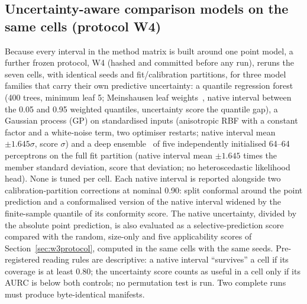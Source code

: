 \documentclass[11pt,a4paper]{article}
\begin{document}
\subsection{Uncertainty-aware comparison models on the same cells (protocol W4)}
\label{sec:w4protocol}
Because every interval in the method matrix is built around one point model,
a further frozen protocol, W4 (hashed and committed before any run), reruns the
seven cells, with identical seeds and fit/calibration partitions, for three
model families that carry their own predictive uncertainty: a quantile
regression forest (400 trees, minimum leaf 5; Meinshausen leaf
weights~\cite{meinshausen2006},
native interval between the 0.05 and 0.95 weighted quantiles, uncertainty
score the quantile gap), a Gaussian process (GP) on standardised inputs
(anisotropic RBF with a constant factor and a white-noise term, two optimiser
restarts; native interval mean $\pm 1.645\sigma$, score $\sigma$) and a deep
ensemble~\cite{lakshminarayanan2017} of five independently initialised 64--64
perceptrons on the full fit
partition (native interval mean $\pm 1.645$ times the member standard
deviation, score that deviation; no heteroscedastic likelihood head). None is
tuned per cell. Each native interval is reported alongside two
calibration-partition corrections at nominal 0.90: split conformal around the
point prediction and a conformalised version of the native interval widened by
the finite-sample quantile of its conformity score. The native uncertainty,
divided by the absolute point prediction, is also evaluated as a
selective-prediction score compared with the random, size-only and five
applicability scores of Section~\ref{sec:w3protocol}, computed in the same
cells with the same seeds. Pre-registered reading rules are descriptive: a
native interval ``survives'' a cell if its coverage is at least 0.80; the
uncertainty score counts as useful in a cell only if its AURC is below both
controls; no permutation test is run. Two complete runs must produce
byte-identical manifests.
\end{document}
